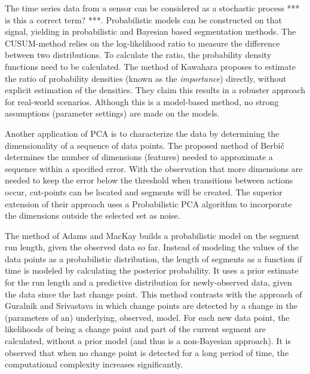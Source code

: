 The time series data from a sensor can be considered as a stochastic process *** is this a correct term? ***.
Probabilistic models can be constructed on that signal, yielding in probabilistic and Bayesian based segmentation methods.
The CUSUM-method relies on the log-likelihood ratio to measure the difference between two distributions.
To calculate the ratio, the probability density functions need to be calculated.
The method of Kawahara \etal \cite{kawahara2009change} proposes to estimate the ratio of probability densities (known as the \emph{importance}) directly, without explicit estimation of the densities.
They claim this results in a robuster approach for real-world scenarios.
Although this is a model-based method, no strong assumptions (parameter settings) are made on the models.

Another application of PCA is to characterize the data by determining the dimensionality of a sequence of data points.
The proposed method of Berbi\v{c} \etal \cite{barbivc2004segmenting} determines the number of dimensions (features) needed to approximate a sequence within a specified error.
With the observation that more dimensions are needed to keep the error below the threshold when transitions between actions occur, cut-points can be located and segments will be created.
The superior extension of their approach uses a Probabilistic PCA algorithm to incorporate the dimensions outside the selected set as noise.

The method of Adams and MacKay \cite{adams2007bayesian} builds a probabilistic model on the segment run length, given the observed data so far.
Instead of modeling the values of the data points as a probabilistic distribution, the length of segments as a function if time is modeled by calculating the posterior probability.
It uses a prior estimate for the run length and a predictive distribution for newly-observed data, given the data since the last change point.
This method contrasts with the approach of Guralnik and Srivastava \cite{guralnik1999event} in which change points are detected by a change in the (parameters of an) underlying, observed, model.
For each new data point, the likelihoods of being a change point and part of the current segment are calculated, without a prior model (and thus is a non-Bayesian approach).
It is observed that when no change point is detected for a long period of time, the computational complexity increases significantly.